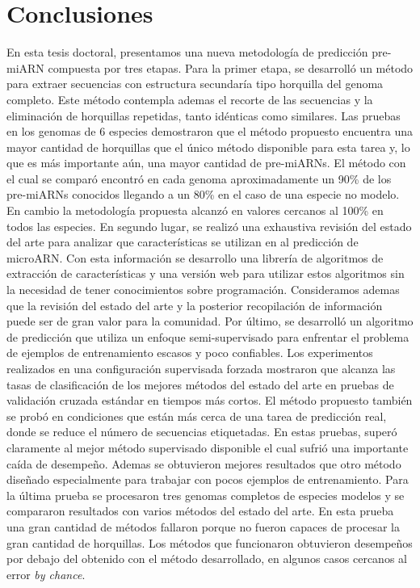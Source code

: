 \chapter{Conclusiones}
En esta tesis doctoral, presentamos una nueva metodología de predicción pre-miARN compuesta por tres etapas. Para la primer etapa, se desarrolló un método para
extraer secuencias con estructura secundaría tipo horquilla del genoma completo. Este método contempla ademas el recorte de las secuencias y la eliminación de
horquillas repetidas, tanto idénticas como similares. Las pruebas en los genomas de 6 especies demostraron que el método propuesto encuentra una mayor cantidad
de horquillas que el único método disponible para esta tarea y, lo que es más importante aún, una mayor cantidad de pre-miARNs. El método con el cual se comparó
encontró en cada genoma aproximadamente un 90\% de los pre-miARNs conocidos llegando a un 80\% en el caso de una especie no modelo.  En cambio la metodología
propuesta alcanzó en valores cercanos al 100\% en todos las especies.  En segundo lugar, se realizó una exhaustiva revisión del estado del arte para analizar
que características se utilizan en al predicción de microARN. Con esta información se desarrollo una librería de algoritmos de extracción de características y
una versión web para utilizar estos algoritmos sin la necesidad de tener conocimientos sobre programación. Consideramos ademas que la revisión del estado del
arte y la posterior recopilación de información puede ser de gran valor para la comunidad.  Por último, se desarrolló un algoritmo de predicción que utiliza un
enfoque semi-supervisado para enfrentar el problema de ejemplos de entrenamiento escasos y poco confiables. Los experimentos realizados en una configuración
supervisada forzada mostraron que alcanza las tasas de clasificación de los mejores métodos del estado del arte en pruebas de validación cruzada estándar en
tiempos más cortos. El método propuesto también se probó en condiciones que están más cerca de una tarea de predicción real, donde se reduce el número de
secuencias etiquetadas. En estas pruebas, superó claramente al mejor método supervisado disponible el cual sufrió una importante caída de desempeño. Ademas se
obtuvieron mejores resultados que otro método diseñado especialmente para trabajar con pocos ejemplos de entrenamiento. Para la última prueba se procesaron tres
genomas completos de especies modelos y se compararon resultados con varios métodos del estado del arte. En esta prueba una gran cantidad de métodos fallaron
porque no fueron capaces de procesar la gran cantidad de horquillas. Los métodos que funcionaron obtuvieron desempeños por debajo del obtenido con el método
desarrollado, en algunos casos cercanos al error \textit{by chance}.


